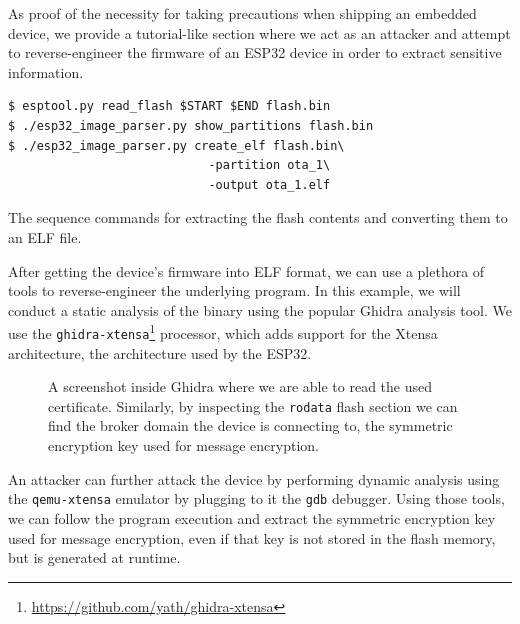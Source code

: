\documentclass[conference]{IEEEtran}
\begin{document}
As proof of the necessity for taking precautions when shipping an embedded device, 
we provide a tutorial-like section where we act as an attacker and attempt to reverse-engineer the firmware of an ESP32
device in order to extract sensitive information.

\begin{listing}[h]
\begin{verbatim}
$ esptool.py read_flash $START $END flash.bin
$ ./esp32_image_parser.py show_partitions flash.bin
$ ./esp32_image_parser.py create_elf flash.bin\
                            -partition ota_1\
                            -output ota_1.elf
\end{verbatim}
\caption{The sequence commands for extracting the flash contents and converting them to an ELF file.}
\end{listing}

After getting the device's firmware into ELF format, we can use a plethora of tools 
to reverse-engineer the underlying program. 
In this example, we will conduct a static analysis of the binary using the popular Ghidra\cite{Ghidra, GhidraBook} analysis tool.
We use the \texttt{ghidra-xtensa}\footnote{\url{https://github.com/yath/ghidra-xtensa}} processor,
which adds support for the Xtensa architecture, the architecture used by the ESP32.

\begin{figure}[h]
    \centering
    \caption{A screenshot inside Ghidra where we are able to read the used certificate. Similarly, 
    by inspecting the \texttt{rodata} flash section we can find the broker domain the device is connecting to, the 
    symmetric encryption key used for message encryption.}
    \label{fig:ghidra}
\end{figure}

An attacker can further attack the device by performing dynamic analysis using the \texttt{qemu-xtensa} emulator
by plugging to it the \texttt{gdb} debugger. 
Using those tools, we can follow the program execution and extract the symmetric encryption key used for message encryption, 
even if that key is not stored in the flash memory, but is generated at runtime.
\end{document}
